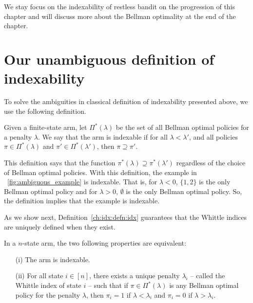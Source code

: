 We stay focus on the indexability of restless bandit on the progression of this chapter and will discuss more about the Bellman optimality at the end of the chapter.

\section{Our unambiguous definition of indexability}
\label{ch:idx:sec:idx}

To solve the ambiguities in classical definition of indexability presented above, we use the following definition.  
\begin{defn}
    Given a finite-state arm, let $\Pi^*(\lambda)$ be the set of all Bellman optimal policies for a penalty $\lambda$.
    We say that the arm is indexable if for all $\lambda<\lambda'$, and all policies $\pi\in\Pi^*(\lambda)$ and $\pi'\in\Pi^*(\lambda')$, then $\pi\supseteq\pi'$.
    \label{ch:idx:defn:idx}
\end{defn}
This definition says that the function $\pi^*(\lambda)\supseteq\pi^*(\lambda')$ regardless of the choice of Bellman optimal policies.
With this definition, the example in \figurename~\ref{fig:ambiguous_example} is indexable.
That is, for $\lambda<0$, $\{1,2\}$ is the only Bellman optimal policy and for $\lambda>0$, $\emptyset$ is the only Bellman optimal policy.
So, the definition implies that the example is indexable.

As we show next, Definition~\ref{ch:idx:defn:idx} guarantees that the Whittle indices are uniquely defined when they exist.
\begin{lem}
    \label{ch:idx:lem:idx}
    In a $n$-state arm, the two following properties are equivalent: 
    \begin{enumerate}
        \item[(i)] The arm is indexable.
        \item[(ii)] For all state $i\in[n]$, there exists a unique penalty $\lambda_i$ -- called the Whittle index of state $i$ -- such that if $\pi\in\Pi^*(\lambda)$ is any Bellman optimal policy for the penalty $\lambda$, then $\pi_i=1$ if $\lambda<\lambda_i$ and $\pi_i=0$ if $\lambda>\lambda_i$. 
    \end{enumerate}
\end{lem}

